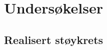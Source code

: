 \section{Undersøkelser}
\label{sec:research}

\subsection{Realisert støykrets}
\label{subsec:realised_noisegenerator}
